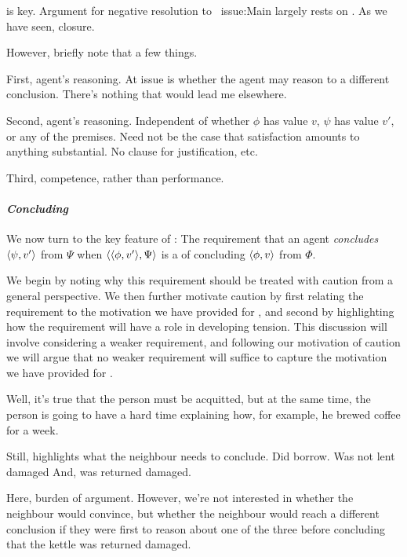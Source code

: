 \begin{note}
  \izetaS{} is key.
  Argument for negative resolution to~{\color{red} issue:Main} largely rests on \izetaS{}.
  As we have seen, closure.

  However, briefly note that a few things.

  First, agent's reasoning.
  At issue is whether the agent may reason to a different conclusion.
  There's nothing that would lead me elsewhere.

  Second, agent's reasoning.
  Independent of whether \(\phi\) has value \(v\), \(\psi\) has value \(v'\), or any of the premises.
  Need not be the case that satisfaction amounts to anything substantial.
  No clause for justification, etc.

  Third, competence, rather than performance.
\end{note}

\paragraph*{\emph{Concluding}}

\begin{note}
  We now turn to the key feature of \izetaS{}:
  The requirement that an agent \emph{concludes} \(\langle \psi, v' \rangle\) from \(\Psi\) when \(\langle \langle \phi, v' \rangle, \Psi \rangle\) is a \requ{} of concluding \(\langle \phi, v \rangle\) from \(\Phi\).

  We begin by noting why this requirement should be treated with caution from a general perspective.
  We then further motivate caution by first relating the requirement to the motivation we have provided for \csN{}, and second by highlighting how the requirement will have a role in developing tension.
  This discussion will involve considering a weaker requirement, and following our motivation of caution we will argue that no weaker requirement will suffice to capture the motivation we have provided for \csN{}.
\end{note}


\begin{note}
  Well, it's true that the person must be acquitted, but at the same time, the person is going to have a hard time explaining how, for example, he brewed coffee for a week.

  Still, highlights what the neighbour needs to conclude.
  Did borrow.
  Was not lent damaged
  And, was returned damaged.

  Here, burden of argument.
  However, we're not interested in whether the neighbour would convince, but whether the neighbour would reach a different conclusion if they were first to reason about one of the three before concluding that the kettle was returned damaged.
\end{note}

